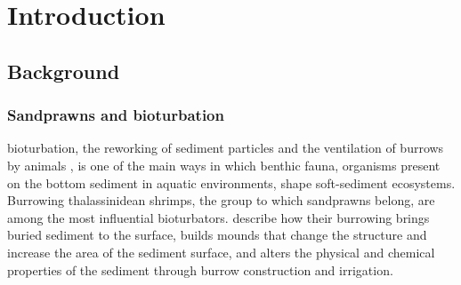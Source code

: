 \providecommand{\todo}[1]{\textcolor{red}{[TODO: #1]}}
\chapter{Introduction}
\label{ch:introduction}
\section{Background}
\label{sec:ch1.background}
\subsection{Sandprawns and bioturbation}
\label{subsec:ch1.section1.subsec1}
\Gls{bioturbation}, the reworking of sediment particles and the ventilation of burrows by animals \citep{kristensenWhatBioturbationNeed2012}, is one of the main ways in which \gls{benthic} fauna, organisms present on the bottom sediment in aquatic environments, shape soft-sediment ecosystems. Burrowing thalassinidean shrimps, the group to which sandprawns belong, are among the most influential bioturbators. \citet{inbook} describe how their burrowing brings buried sediment to the surface, builds mounds that change the structure and increase the area of the sediment surface, and alters the physical and chemical properties of the sediment through burrow construction and irrigation. 

